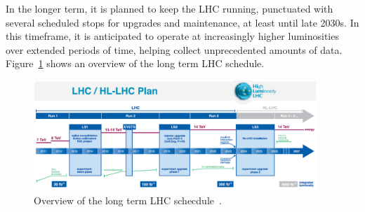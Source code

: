 In the longer term, it is planned to keep the LHC running, punctuated with several scheduled stops for upgrades and maintenance, at least until late 2030s. In this timeframe, it is anticipated to operate at increasingly higher luminosities over extended periods of time, helping collect unprecedented amounts of data. Figure~\ref{fig:lhc_schedule} shows an overview of the long term LHC schedule. 
\begin{figure}
  \begin{center}
  \captionsetup{justification=centering}
  \includegraphics[width=0.95\textwidth,keepaspectratio]{plots_and_figures/chapter3/lhc_schedule.png}
\caption{Overview of the long term LHC schecdule~\cite{LHC_plan_ref}.}
\label{fig:lhc_schedule}
\end{center}
\end{figure}



